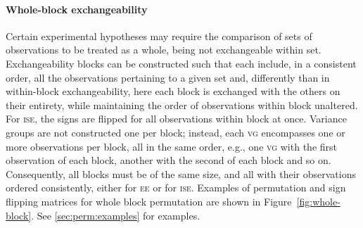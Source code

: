 \paragraph{Whole-block exchangeability}

Certain experimental hypotheses may require the comparison of sets of observations to be treated as a whole, being not exchangeable within set. Exchangeability blocks can be constructed such that each include, in a consistent order, all the observations pertaining to a given set and, differently than in within-block exchangeability, here each block is exchanged with the others on their entirety, while maintaining the order of observations within block unaltered. For \textsc{ise}, the signs are flipped for all observations within block at once. Variance groups are not constructed one per block; instead, each \textsc{vg} encompasses one or more observations per block, all in the same order, e.g., one \textsc{vg} with the first observation of each block, another with the second of each block and so on. Consequently, all blocks must be of the same size, and all with their observations ordered consistently, either for \textsc{ee} or for \textsc{ise}. Examples of permutation and sign flipping matrices for whole block permutation are shown in Figure~\ref{fig:whole-block}. See \ref{sec:perm:examples} for examples.

